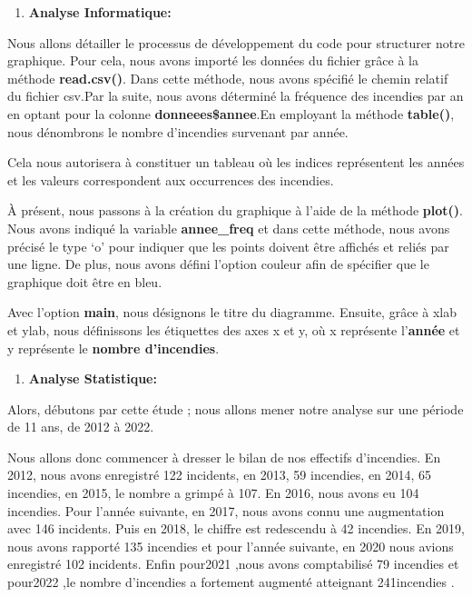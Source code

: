 \documentclass[
]{article}
\providecommand{\tightlist}{%
  \setlength{\itemsep}{0pt}\setlength{\parskip}{0pt}}
\begin{document}
\begin{enumerate}
\def\labelenumi{\arabic{enumi}.}
\tightlist
\item
  \textbf{Analyse Informatique:}
\end{enumerate}

Nous allons détailler le processus de développement du code pour
structurer notre graphique. Pour cela, nous avons importé les données du
fichier grâce à la méthode \textbf{read.csv()}. Dans cette méthode, nous
avons spécifié le chemin relatif du fichier csv.Par la suite, nous avons
déterminé la fréquence des incendies par an en optant pour la colonne
\textbf{donneees\$annee}.En employant la méthode \textbf{table()}, nous
dénombrons le nombre d'incendies survenant par année.

Cela nous autorisera à constituer un tableau où les indices représentent
les années et les valeurs correspondent aux occurrences des incendies.

À présent, nous passons à la création du graphique à l'aide de la
méthode \textbf{plot()}. Nous avons indiqué la variable
\textbf{annee\_freq} et dans cette méthode, nous avons précisé le type
`o' pour indiquer que les points doivent être affichés et reliés par une
ligne. De plus, nous avons défini l'option couleur afin de spécifier que
le graphique doit être en bleu.

Avec l'option \textbf{main}, nous désignons le titre du diagramme.
Ensuite, grâce à xlab et ylab, nous définissons les étiquettes des axes
x et y, où x représente l'\textbf{année} et y représente le
\textbf{nombre d'incendies}.

\begin{enumerate}
\def\labelenumi{\arabic{enumi}.}
\setcounter{enumi}{1}
\tightlist
\item
  \textbf{Analyse Statistique:}
\end{enumerate}

Alors, débutons par cette étude ; nous allons mener notre analyse sur
une période de 11 ans, de 2012 à 2022.

Nous allons donc commencer à dresser le bilan de nos effectifs
d'incendies. En 2012, nous avons enregistré 122 incidents, en 2013, 59
incendies, en 2014, 65 incendies, en 2015, le nombre a grimpé à 107. En
2016, nous avons eu 104 incendies. Pour l'année suivante, en 2017, nous
avons connu une augmentation avec 146 incidents. Puis en 2018, le
chiffre est redescendu à 42 incendies. En 2019, nous avons rapporté 135
incendies et pour l'année suivante, en 2020 nous avions enregistré 102
incidents. Enfin pour2021 ,nous avons comptabilisé 79 incendies et
pour2022 ,le nombre d'incendies a fortement augmenté atteignant
241incendies .
\end{document}
